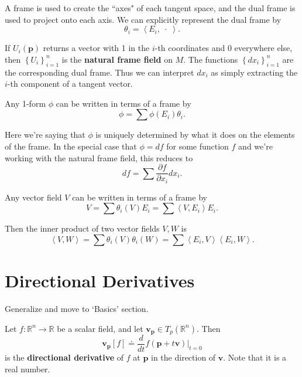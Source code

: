 \documentclass[twoside,10pt]{report}
\begin{document}
A frame is used to create the ``axes" of each tangent space, and the dual frame is used to project onto each axis. We can explicitly represent the dual frame by
\[
	\theta_i = \left\langle E_i, \;\cdot\; \right\rangle.
\] 

\begin{ex}[]
	If $U_i(\mathbf{p})$ returns a vector with 1 in the $i$-th coordinates and 0 everywhere else, then $\left\{ U_i \right\}_{i=1}^n$ is the \textbf{natural frame field} on $M$. The functions $\left\{ dx_{i} \right\}_{i=1}^n$ are the corresponding dual frame. Thus we can interpret $dx_i$ as simply extracting the $ i$-th component of a tangent vector.
\end{ex}

\begin{prop}
Any 1-form $\phi$ can be written in terms of a frame by
\[
	\phi = \sum \phi(E_i) \theta_i.
\] 
\end{prop}

Here we're saying that $\phi$ is uniquely determined by what it does on the elements of the frame. In the special case that $\phi = df$ for some function $f$ and we're working with the natural frame field, this reduces to
\[
df = \sum \frac{\partial f}{\partial x_i} dx_i.
\] 

\begin{prop}
Any vector field $V$ can be written in terms of a frame by
\[V = \sum \theta_i(V) E_i = \sum \left\langle V,E_i \right\rangle E_i.\]
\end{prop}

Then the inner product of two vector fields $V,W$ is
\[
	\left\langle V,W \right\rangle = \sum \theta_i(V) \theta_i(W) = \sum \left\langle E_i, V \right\rangle \left\langle E_i, W \right\rangle.
\] 



\section{Directional Derivatives}

{\color{red}Generalize and move to `Basics' section.}

\begin{defn}
	Let $f:\mathbb{R}^n \to \mathbb{R}$ be a scalar field, and let $\mathbf{v}_{\mathbf{p}} \in T_p(\mathbb{R}^n)$. Then
	\[
		\mathbf{v}_{\mathbf{p}}[f] \doteq \frac{d }{d t} f(\mathbf{p}+t\mathbf{v}) \Big|_{t=0}
\] is the \textbf{directional derivative} of $f$ at $\mathbf{p}$ in the direction of $\mathbf{v}$. Note that it is a real number.
\end{defn}
\end{document}
